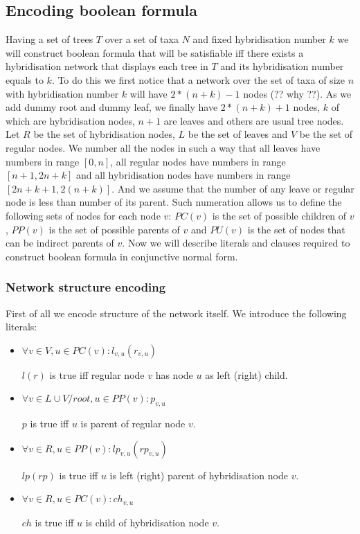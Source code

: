 \documentclass[runningheads, envcountsame, a4paper]{llncs}
\begin{document}
\subsection{Encoding boolean formula}

Having a set of trees $T$ over a set of taxa $N$ and fixed hybridisation number $k$ we will construct boolean formula 
that will be satisfiable iff there exists a hybridisation network that displays each tree in $T$ and its hybridisation 
number equals to $k$. To do this we first notice that a network over the set of taxa of size $n$ with hybridisation number 
$k$ will have $2 * (n + k) - 1$ nodes (?? why ??). As we add dummy root and dummy leaf, we finally have $2 * (n + k) + 1$ nodes, 
$k$ of which are hybridisation nodes, $n + 1$ are leaves and others are usual tree nodes. Let $R$ be the set of hybridisation 
nodes, $L$ be the set of leaves and $V$ be the set of regular nodes. We number all the nodes in such a way that all leaves 
have numbers in range $[0,n]$, all regular nodes have numbers in range $[n + 1,2n + k]$ and all hybridisation nodes have numbers 
in range $[2n + k + 1, 2(n + k)]$. And we assume that the number of any leave or regular node is less than number of its parent. 
Such numeration allows us to define the following sets of nodes for each node $v$: $PC(v)$ is the set of possible children of $v$, 
$PP(v)$ is the set of possible parents of $v$ and $PU(v)$ is the set of nodes that can be indirect parents of $v$. Now we will 
describe literals and clauses required to construct boolean formula in conjunctive normal form.

\subsubsection{Network structure encoding}

First of all we encode structure of the network itself. We introduce the following literals: 

\begin{itemize}

\item $\forall v \in V, u \in PC(v) : l_{v,u}(r_{v,u})$ 

$l (r)$ is true iff regular node $v$ has node $u$ as left (right) child.

\item $\forall v \in L \cup V / root, u \in PP(v) : p_{v,u}$ 

$p$ is true iff $u$ is parent of regular node $v$.

\item $\forall v \in R, u \in PP(v) : lp_{v,u}(rp_{v,u})$ 

$lp (rp)$ is true iff $u$ is left (right) parent of hybridisation node $v$.

\item $\forall v \in R, u \in PC(v) : ch_{v,u}$ 

$ch$ is true iff $u$ is child of hybridisation node $v$.

\end{itemize}
\end{document}
